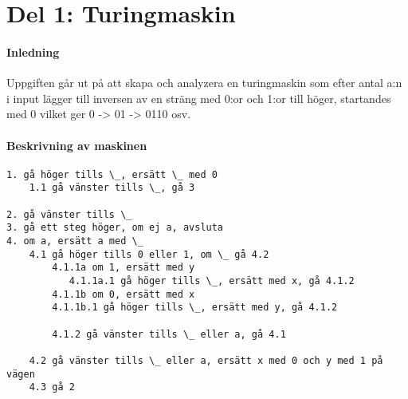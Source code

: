 \section{Del 1: Turingmaskin}
\paragraph{Inledning}    
Uppgiften går ut på att skapa och analyzera en turingmaskin som efter antal a:n i input lägger till inversen av en sträng med 0:or och 1:or till höger, startandes med 0 vilket ger 0 -> 01 -> 0110 osv.

\paragraph{Beskrivning av maskinen}
\begin{verbatim}
1. gå höger tills \_, ersätt \_ med 0 
    1.1 gå vänster tills \_, gå 3

2. gå vänster tills \_
3. gå ett steg höger, om ej a, avsluta 
4. om a, ersätt a med \_ 
    4.1 gå höger tills 0 eller 1, om \_ gå 4.2 
        4.1.1a om 1, ersätt med y   
           4.1.1a.1 gå höger tills \_, ersätt med x, gå 4.1.2  
        4.1.1b om 0, ersätt med x 
        4.1.1b.1 gå höger tills \_, ersätt med y, gå 4.1.2 

        4.1.2 gå vänster tills \_ eller a, gå 4.1  
    
    4.2 gå vänster tills \_ eller a, ersätt x med 0 och y med 1 på vägen 
    4.3 gå 2
\end{verbatim}
